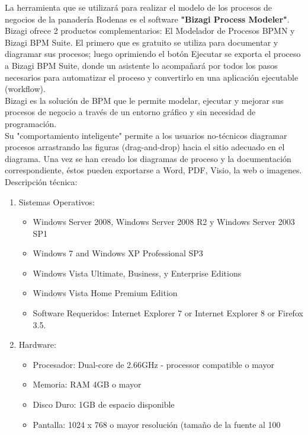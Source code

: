 La herramienta que se utilizará para realizar el modelo de los procesos de negocios de la panadería Rodenas es el software \textbf{"Bizagi Process Modeler"}.
\\

Bizagi ofrece 2 productos complementarios: El Modelador de Procesos BPMN y Bizagi BPM Suite. El primero que es gratuito se utiliza para documentar y diagramar sus procesos; luego oprimiendo el botón Ejecutar se exporta el proceso a Bizagi BPM Suite, donde un asistente lo acompañará por todos los pasos necesarios para automatizar el proceso y convertirlo en una aplicación ejecutable (workflow).
\\
Bizagi es la solución de BPM que le permite modelar, ejecutar y mejorar sus procesos de negocio a través de un entorno gráfico y sin necesidad de programación.
\\
Su "comportamiento inteligente" permite a los usuarios no-técnicos diagramar procesos arrastrando las figuras (drag-and-drop) hacia el sitio adecuado en el diagrama. Una vez se han creado los diagramas de proceso y la documentación correspondiente, éstos pueden exportarse a Word, PDF, Visio, la web o imagenes.
\\
Descripción técnica:
\begin{enumerate}

\item Sistemas Operativos:
\begin{itemize}
\item Windows Server 2008, Windows Server 2008 R2 y Windows Server 2003 SP1
\item Windows 7 and Windows XP Professional SP3 
\item Windows Vista Ultimate, Business, y Enterprise Editions
\item Windows Vista Home Premium Edition
\\
\item Software Requeridos: Internet Explorer 7 or Internet Explorer 8 or Firefox 3.5.
\end{itemize}

\item Hardware:
\begin{itemize}
\item Procesador: Dual-core de 2.66GHz - processor compatible o mayor
\item Memoria: RAM 4GB o mayor
\item Disco Duro: 1GB de espacio disponible
\item Pantalla: 1024 x 768 o mayor resolución (tamaño de la fuente al 100%
\end{itemize}
\end{enumerate}



